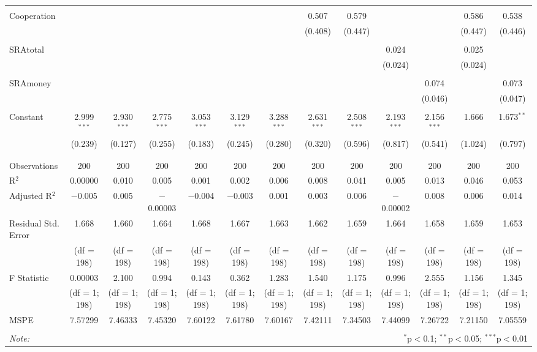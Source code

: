 \documentclass[12pt]{article}
\begin{document}
\begin{table}[!htbp]
\begin{adjustbox}{width=\textwidth}
\begin{tabular}{@{\extracolsep{5pt}}lcccccccccccc}
  & & & & & & & & & & & & \\ 
 Cooperation &  &  &  &  &  &  & 0.507 & 0.579 &  &  & 0.586 & 0.538 \\ 
  &  &  &  &  &  &  & (0.408) & (0.447) &  &  & (0.447) & (0.446) \\ 
  & & & & & & & & & & & & \\ 
 SRAtotal &  &  &  &  &  &  &  &  & 0.024 &  & 0.025 &  \\ 
  &  &  &  &  &  &  &  &  & (0.024) &  & (0.024) &  \\ 
  & & & & & & & & & & & & \\ 
 SRAmoney &  &  &  &  &  &  &  &  &  & 0.074 &  & 0.073 \\ 
  &  &  &  &  &  &  &  &  &  & (0.046) &  & (0.047) \\ 
  & & & & & & & & & & & & \\ 
 Constant & 2.999$^{***}$ & 2.930$^{***}$ & 2.775$^{***}$ & 3.053$^{***}$ & 3.129$^{***}$ & 3.288$^{***}$ & 2.631$^{***}$ & 2.508$^{***}$ & 2.193$^{***}$ & 2.156$^{***}$ & 1.666 & 1.673$^{**}$ \\ 
  & (0.239) & (0.127) & (0.255) & (0.183) & (0.245) & (0.280) & (0.320) & (0.596) & (0.817) & (0.541) & (1.024) & (0.797) \\ 
  & & & & & & & & & & & & \\ 
\hline \\[-1.8ex] 
Observations & 200 & 200 & 200 & 200 & 200 & 200 & 200 & 200 & 200 & 200 & 200 & 200 \\ 
R$^{2}$ & 0.00000 & 0.010 & 0.005 & 0.001 & 0.002 & 0.006 & 0.008 & 0.041 & 0.005 & 0.013 & 0.046 & 0.053 \\ 
Adjusted R$^{2}$ & $-$0.005 & 0.005 & $-$0.00003 & $-$0.004 & $-$0.003 & 0.001 & 0.003 & 0.006 & $-$0.00002 & 0.008 & 0.006 & 0.014 \\ 
Residual Std. Error & 1.668 & 1.660  & 1.664 & 1.668 & 1.667  & 1.663 & 1.662  & 1.659  & 1.664  & 1.658 & 1.659  & 1.653  \\ 
& (df = 198) & (df = 198) & (df = 198) & (df = 198) & (df = 198) & (df = 198) & (df = 198) & (df = 198) & (df = 198) & (df = 198) & (df = 198) & (df = 198) \\
F Statistic & 0.00003 & 2.100  & 0.994  & 0.143 & 0.362  & 1.283 & 1.540  & 1.175 & 0.996 & 2.555 & 1.156  & 1.345  \\ 
& (df = 1; 198) & (df = 1; 198) & (df = 1; 198) & (df = 1; 198) & (df = 1; 198) & (df = 1; 198) & (df = 1; 198) & (df = 1; 198) & (df = 1; 198) & (df = 1; 198) & (df = 1; 198) & (df = 1; 198)  \\
MSPE & 7.57299 & 7.46333 & 7.45320 & 7.60122 & 7.61780 & 7.60167 & 7.42111 & 7.34503 & 7.44099 & 7.26722 & 7.21150 & 7.05559 \\
\hline 
\hline \\[-1.8ex] 
\textit{Note:}  & \multicolumn{12}{r}{$^{*}$p$<$0.1; $^{**}$p$<$0.05; $^{***}$p$<$0.01} \\ 
\end{tabular} 
\end{adjustbox}
\end{table}
\end{document}
